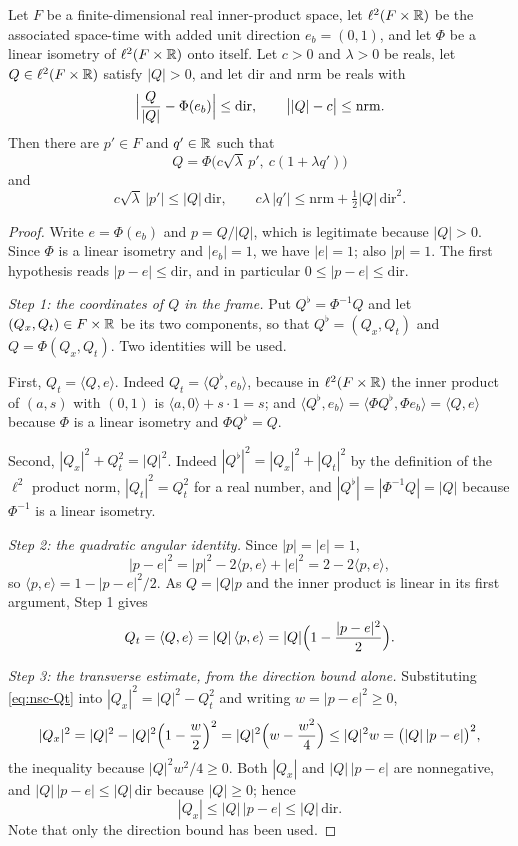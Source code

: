 \begin{lemma}
Let $F$ be a finite-dimensional real inner-product space, let
$\ell^2(F\times\mathbb{R})$ be the associated space-time with added unit direction
$e_b=(0,1)$, and let $\Phi$ be a linear isometry of $\ell^2(F\times\mathbb{R})$ onto itself.
Let $c>0$ and $\lambda>0$ be reals, let $Q\in\ell^2(F\times\mathbb{R})$ satisfy $|Q|>0$, and
let $\mathrm{dir}$ and $\mathrm{nrm}$ be reals with
\[
  \Bigl|\frac{Q}{|Q|}-\Phi(e_b)\Bigr|\le\mathrm{dir},
  \qquad \bigl||Q|-c\bigr|\le\mathrm{nrm}.
\]
Then there are $p'\in F$ and $q'\in\mathbb{R}$ such that
\[
  Q=\Phi\bigl(c\sqrt\lambda\,p',\ c(1+\lambda q')\bigr)
\]
and
\[
  c\sqrt\lambda\,|p'|\le|Q|\,\mathrm{dir},
  \qquad
  c\lambda\,|q'|\le\mathrm{nrm}+\tfrac12|Q|\,\mathrm{dir}^2 .
\]
\end{lemma}
\begin{proof}
Write $e=\Phi(e_b)$ and $p=Q/|Q|$, which is legitimate because $|Q|>0$. Since $\Phi$
is a linear isometry and $|e_b|=1$, we have $|e|=1$; also $|p|=1$. The first hypothesis
reads $|p-e|\le\mathrm{dir}$, and in particular $0\le|p-e|\le\mathrm{dir}$.

\emph{Step 1: the coordinates of $Q$ in the frame.}
Put $Q^\flat=\Phi^{-1}Q$ and let $(Q_x,Q_t)\in F\times\mathbb{R}$ be its two components, so
that $Q^\flat=(Q_x,Q_t)$ and $Q=\Phi(Q_x,Q_t)$. Two identities will be used.

First, $Q_t=\langle Q,e\rangle$. Indeed $Q_t=\langle Q^\flat,e_b\rangle$, because in
$\ell^2(F\times\mathbb{R})$ the inner product of $(a,s)$ with $(0,1)$ is
$\langle a,0\rangle+s\cdot1=s$; and $\langle Q^\flat,e_b\rangle=\langle\Phi
Q^\flat,\Phi e_b\rangle=\langle Q,e\rangle$ because $\Phi$ is a linear isometry and
$\Phi Q^\flat=Q$.

Second, $|Q_x|^2+Q_t^2=|Q|^2$. Indeed $|Q^\flat|^2=|Q_x|^2+|Q_t|^2$ by the definition
of the $\ell^2$ product norm, $|Q_t|^2=Q_t^2$ for a real number, and
$|Q^\flat|=|\Phi^{-1}Q|=|Q|$ because $\Phi^{-1}$ is a linear isometry.

\emph{Step 2: the quadratic angular identity.}
Since $|p|=|e|=1$,
\[
  |p-e|^2=|p|^2-2\langle p,e\rangle+|e|^2=2-2\langle p,e\rangle,
\]
so $\langle p,e\rangle=1-|p-e|^2/2$. As $Q=|Q|p$ and the inner product is linear in its
first argument, Step 1 gives
\begin{equation}\label{eq:nsc-Qt}
  Q_t=\langle Q,e\rangle=|Q|\,\langle p,e\rangle=|Q|\Bigl(1-\frac{|p-e|^2}2\Bigr).
\end{equation}

\emph{Step 3: the transverse estimate, from the direction bound alone.}
Substituting \eqref{eq:nsc-Qt} into $|Q_x|^2=|Q|^2-Q_t^2$ and writing $w=|p-e|^2\ge0$,
\[
  |Q_x|^2=|Q|^2-|Q|^2\Bigl(1-\frac w2\Bigr)^2
   =|Q|^2\Bigl(w-\frac{w^2}4\Bigr)\le|Q|^2w=\bigl(|Q|\,|p-e|\bigr)^2 ,
\]
the inequality because $|Q|^2w^2/4\ge0$. Both $|Q_x|$ and $|Q|\,|p-e|$ are
nonnegative, and $|Q|\,|p-e|\le|Q|\,\mathrm{dir}$ because $|Q|\ge0$; hence
\begin{equation}\label{eq:nsc-x}
  |Q_x|\le|Q|\,|p-e|\le|Q|\,\mathrm{dir}.
\end{equation}
Note that only the direction bound has been used.


\end{proof}
